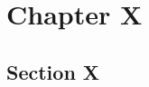 \documentclass[../main.tex]{subfiles}
\begin{document}
\section{Chapter X}

\lipsum[1-5]

\subsection{Section X}

\lipsum[1-5]
\end{document}
